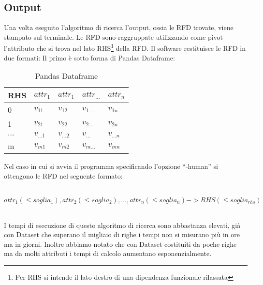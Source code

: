 \subsection{Output}
Una volta eseguito l’algoritmo di ricerca l’output, ossia le RFD trovate, viene stampato sul terminale. Le RFD sono raggruppate utilizzando come pivot l’attributo che si trova nel lato RHS\footnote{Per RHS si intende il lato destro di una dipendenza funzionale rilassata} della RFD. Il software restituisce le RFD in due formati:
Il primo è sotto forma di Pandas Dataframe:
\begin{table}[h]
    \centering
    \begin{tabular}{l  l  l  l  l }
     RHS & $attr_1$ & $attr_1$ &$attr_{\ldots}$ & $attr_n$ \\
    \hline
    0 & $v_{11}$ & $v_{12}$ & $v_{1\ldots}$ & $v_{1n}$\\
    1 & $v_{21}$ & $v_{22}$ & $v_{2\ldots}$ & $v_{2n}$\\
    $\ldots$ & $v_{\ldots1}$ & $v_{\ldots2}$ & $v_{\ldots}$ & $v_{\ldots n}$\\
    m & $v_{m1}$ & $v_{m2}$ & $v_{m\ldots}$ & $v_{mn}$\\
    \end{tabular}
    \caption{Pandas Dataframe}
    \label{tab:pandas_dataframe}
\end{table}


Nel caso in cui si avvia il programma specificando l’opzione “-human” si ottengono le RFD nel seguente formato:
\\
\\
\centerline{$attr_1(\leq soglia_1),attr_2(\leq soglia_2),\ldots,{attr_n}(\leq soglia_n)->RHS(\leq soglia_{rhs})$}
\\

I tempi di esecuzione di questo algoritmo di ricerca sono abbastanza elevati, già con Dataset che superano il migliaio di righe i tempi non si misurano più in ore ma in giorni. Inoltre abbiamo notato che con Dataset costituiti da poche righe ma da molti attributi i tempi di calcolo aumentano esponenzialmente.